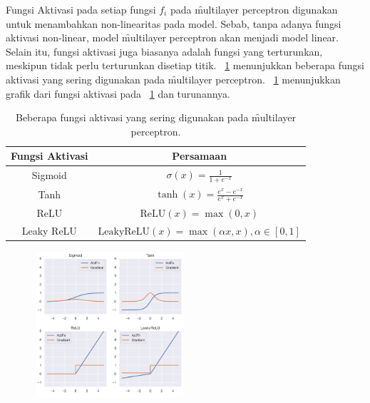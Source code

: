     Fungsi Aktivasi pada setiap fungsi $f_i$ pada \f{multilayer perceptron} digunakan untuk menambahkan non-linearitas pada model. Sebab, tanpa adanya fungsi aktivasi non-linear, model \f{multilayer perceptron} akan menjadi model linear. Selain itu, fungsi aktivasi juga biasanya adalah fungsi yang terturunkan, meskipun tidak perlu terturunkan disetiap titik. \tab~\ref{tab:activation-function} menunjukkan beberapa fungsi aktivasi yang sering digunakan pada \f{multilayer perceptron}. \pic~\ref{fig:activation-function} menunjukkan grafik dari fungsi aktivasi pada \tab~\ref{tab:activation-function} dan turunannya.
    \begin{table}
        \centering
        \caption{Beberapa fungsi aktivasi yang sering digunakan pada \f{multilayer perceptron}.}
        \label{tab:activation-function}
        \begin{tabular}{|c|c|}
            \hline
            \textbf{Fungsi Aktivasi} & \textbf{Persamaan} \\
            \hline
            \hline
            Sigmoid & $\sigma(x) = \frac{1}{1 + e^{-x}}$ \\
            \hline
            Tanh & $\tanh(x) = \frac{e^x - e^{-x}}{e^x + e^{-x}}$ \\
            \hline
            ReLU & $\text{ReLU}(x) = \max(0, x)$ \\
            \hline
            Leaky ReLU & $\text{LeakyReLU}(x) = \max(\alpha x, x), \alpha \in [0, 1]$ \\
            \hline
        \end{tabular}
    \end{table}
    \begin{figure}
        \centering
        \includegraphics[width=0.5\textwidth]{assets/pics/act_function.png}
        \label{fig:activation-function}
    \end{figure}


